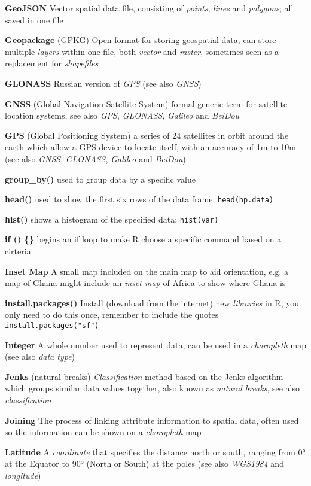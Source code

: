 \documentclass[a4paper,10pt]{article}
\begin{document}
\begin{multicols}{2}
\textbf{GeoJSON} Vector spatial data file, consisting of \textit{points}, \textit{lines} and \textit{polygons}; all saved in one file

\textbf{Geopackage} (GPKG) Open format for storing geospatial data, can store multiple \textit{layers} within one file, both \textit{vector} and \textit{raster}, sometimes seen as a replacement for \textit{shapefiles}

\textbf{GLONASS} Russian version of \textit{GPS} (see also \textit{GNSS})

\textbf{GNSS} (Global Navigation Satellite System) formal generic term for satellite location systems, see also \textit{GPS}, \textit{GLONASS}, \textit{Galileo} and \textit{BeiDou}

\textbf{GPS} (Global Positioning System) a series of 24 satellites in orbit around the earth which allow a GPS device to locate itself, with an accuracy of 1m to 10m  (see also \textit{GNSS}, \textit{GLONASS}, \textit{Galileo} and \textit{BeiDou})

\textbf{group\_by()} used to group data by a specific value

\textbf{head()} used to show the first six rows of the data frame: \texttt{head(hp.data)}

\textbf{hist()} shows a histogram of the specified data: \texttt{hist(var)}

\textbf{if () \{\} } begins an if loop to make R choose a specific command based on a cirteria

\textbf{Inset Map} A small map included on the main map to aid orientation, e.g. a map of Ghana might include an \textit{inset map} of Africa to show where Ghana is

\textbf{install.packages()} Install (download from the internet) new \textit{libraries} in R, you only need to do this once, remember to include the quotes \texttt{install.packages("sf")}

\textbf{Integer} A whole number used to represent data, can be used in a \textit{choropleth} map (see also \textit{data type}) 

\textbf{Jenks} (natural breaks) \textit{Classification} method based on the Jenks algorithm which groups similar data values together, also known as \textit{natural breaks}, see also \textit{classification}

\textbf{Joining} The process of linking attribute information to spatial data, often used so the information can be shown on a \textit{choropleth} map 

\textbf{Latitude} A \textit{coordinate} that specifies the distance north or south, ranging from \ang{0} at the Equator to \ang{90} (North or South) at the poles (see also \textit{WGS1984} and \textit {longitude})


\end{multicols}
\end{document}
